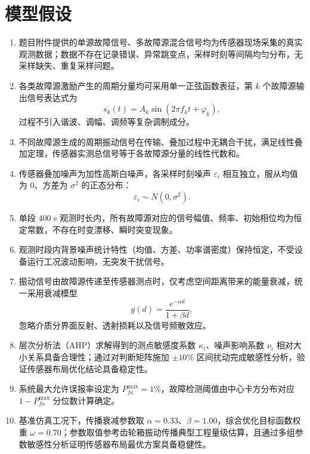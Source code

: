 \documentclass[UTF8,a4paper,12pt]{ctexart}
\numberwithin{figure}{section}
\numberwithin{table}{section}
\begin{document}
\section{模型假设}
\begin{enumerate}
\renewcommand{\labelenumi}{假设 \arabic{enumi}：}
  \item 题目附件提供的单源故障信号、多故障源混合信号均为传感器现场采集的真实观测数据；数据不存在记录错误、异常跳变点，采样时刻等间隔均匀分布，无采样缺失、重复采样问题。
  \item 各类故障源激励产生的周期分量均可采用单一正弦函数表征，第 \(k\) 个故障源输出信号表达式为
  \[
  s_k(t)=A_k\sin(2\pi f_k t+\varphi_k),
  \]
  过程不引入谐波、调幅、调频等复杂调制成分。
  \item 不同故障源生成的周期振动信号在传输、叠加过程中无耦合干扰，满足线性叠加定理，传感器实测总信号等于各故障源分量的线性代数和。
  \item 传感器叠加噪声为加性高斯白噪声，各采样时刻噪声 \(\varepsilon_i\) 相互独立，服从均值为 0、方差为 \(\sigma^2\) 的正态分布：
  \[
  \varepsilon_i\sim N(0,\sigma^2).
  \]
  \item 单段 400 s 观测时长内，所有故障源对应的信号幅值、频率、初始相位均为恒定常数，不存在时变漂移、瞬时突变现象。
  \item 观测时段内背景噪声统计特性（均值、方差、功率谱密度）保持恒定，不受设备运行工况波动影响，无突发干扰信号。

  \item 振动信号由故障源传递至传感器测点时，仅考虑空间距离带来的能量衰减，统一采用衰减模型
  \[
  g(d)=\frac{e^{-\alpha d}}{1+\beta d},
  \]
  忽略介质分界面反射、透射损耗以及信号频散效应。
  \item 层次分析法（AHP）求解得到的测点敏感度系数 \(\kappa_i\)、噪声影响系数 \(\nu_i\) 相对大小关系具备合理性；通过对判断矩阵施加 \(\pm10\%\) 区间扰动完成敏感性分析，验证传感器布局优化结论具备稳定性。
  \item 系统最大允许误报率设定为 \(P_{fa}^{\max}=1\%\)，故障检测阈值由中心卡方分布对应 \(1-P_{fa}^{\max}\) 分位数计算确定。
  \item 基准仿真工况下，传播衰减参数取 \(\alpha=0.33\)、\(\beta=1.00\)，综合优化目标函数权重 \(\omega=0.70\)；参数取值参考齿轮箱振动传播典型工程量级估算，且通过多组参数敏感性分析证明传感器布局最优方案具备稳健性。
\end{enumerate}
\end{document}
